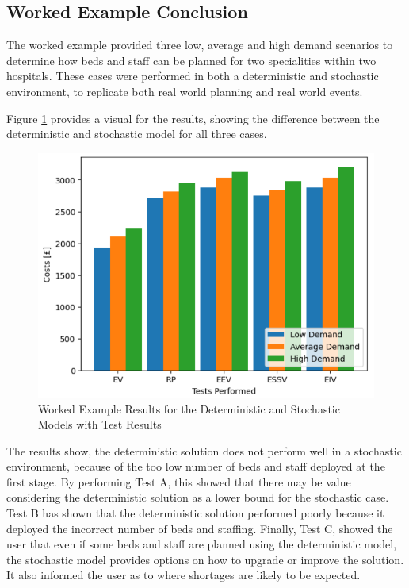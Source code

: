 \documentclass[../thesis.tex]{subfiles}
\begin{document}
{\subsection{Worked Example Conclusion}
The worked example provided three low, average and high demand scenarios to determine how beds and staff can be planned for two specialities within two hospitals. These cases were performed in both a deterministic and stochastic environment, to replicate both real world planning and real world events. 

Figure \ref{fig:WETests} provides a visual for the results, showing the difference between the deterministic and stochastic model for all three cases.

\begin{figure}[h!]
    \centering
    \includegraphics{Chapters/Chapter4New/Figures/WEColumnChart.png}
    \caption{Worked Example Results for the Deterministic and Stochastic Models with Test Results}
    \label{fig:WETests}
\end{figure}

The results show, the deterministic solution does not perform well in a stochastic environment, because of the too low number of beds and staff deployed at the first stage. By performing Test A, this showed that there may be value considering the deterministic solution as a lower bound for the stochastic case. Test B has shown that the deterministic solution performed poorly because it deployed the incorrect number of beds and staffing. Finally, Test C, showed the user that even if some beds and staff are planned using the deterministic model, the stochastic model provides options on how to upgrade or improve the solution. It also informed the user as to where shortages are likely to be expected.

}
\end{document}
